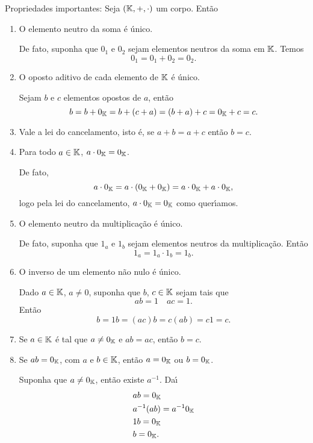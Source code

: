 Propriedades importantes: Seja $(\mathbb{K}, +, \cdot)$ um corpo. Ent\~ao
\begin{enumerate}
	\item O elemento neutro da soma \'e \'unico.
	\begin{solucao}
	De fato, suponha que $0_1$ e $0_2$ sejam elementos neutros da soma em $\mathbb{K}$. Temos
	\[
	0_1 = 0_1 + 0_2 = 0_2.
	\]
	\end{solucao}
	\item O oposto aditivo de cada elemento de $\mathbb{K}$ \'e \'unico.
	\begin{solucao}
	Sejam $b$ e $c$ elementos opostos de $a$, ent\~ao
	\[
	b = b + 0_{\mathbb{K}} = b + (c + a) = (b + a) + c = 0_{\mathbb{K}} + c = c.
	\]
	\end{solucao}
	\item Vale a lei do cancelamento, isto \'e, se $a + b = a + c$ ent\~ao $b = c$.
	\item Para todo $a \in \mathbb{K}$, $a\cdot 0_{\mathbb{K}} = 0_{\mathbb{K}}$.
	\begin{solucao}
	De fato,
	\[
	a\cdot 0_{\mathbb{K}} = a\cdot (0_{\mathbb{K}} + 0_{\mathbb{K}}) = a\cdot 0_{\mathbb{K}} + a\cdot 0_{\mathbb{K}},
	\]
	logo pela lei do cancelamento, $a\cdot 0_{\mathbb{K}} = 0_{\mathbb{K}}$ como quer{\'\i}amos.
	\end{solucao}
	\item O elemento neutro da multiplica\c{c}\~ao \'e \'unico.
	\begin{solucao}
	De fato, suponha que $1_a$ e $1_b$ sejam elementos neutros da multiplica\c{c}\~ao. Ent\~ao
	\[
	1_a = 1_a\cdot 1_b = 1_b.
	\]
	\end{solucao}
	\item O inverso de um elemento n\~ao nulo \'e \'unico.
	\begin{solucao}
	Dado $a \in \mathbb{K}$, $a \ne 0$, suponha que $b$, $c \in \mathbb{K}$ sejam tais que
	\[
	ab = 1 \quad ac = 1.
	\]
	Ent\~ao
	\[
	b = 1b = (ac)b = c(ab) = c1 = c.
	\]
	\end{solucao}
	\item Se $a \in \mathbb{K}$ \'e tal que $a \ne 0_{\mathbb{K}}$ e $ab = ac$, ent\~ao $b = c$.
	\item Se $ab = 0_{\mathbb{K}}$, com $a$ e $b \in \mathbb{K}$, ent\~ao $a = 0_{\mathbb{K}}$ ou $b = 0_{\mathbb{K}}$.
	\begin{solucao}
	Suponha que $a \ne 0_{\mathbb{K}}$, ent\~ao existe $a^{-1}$. Da{\'\i}
	\begin{align*}
	&ab = 0_{\mathbb{K}}\\
	&a^{-1}(ab) = a^{-1}0_{\mathbb{K}}\\
	&1b = 0_{\mathbb{K}}\\
	&b = 0_{\mathbb{K}}.
	\end{align*}
	\end{solucao}
\end{enumerate}

